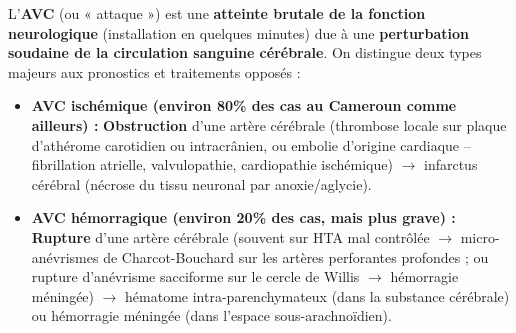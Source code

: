 \documentclass[11pt]{article}
\begin{document}
\begin{definition}
L'\textbf{AVC} (ou « attaque ») est une \textbf{atteinte brutale de la fonction neurologique} (installation en quelques minutes) due à une \textbf{perturbation soudaine de la circulation sanguine cérébrale}. On distingue deux types majeurs aux pronostics et traitements opposés :
\begin{itemize}
    \item \textbf{AVC ischémique (environ 80\% des cas au Cameroun comme ailleurs) :} \textbf{Obstruction} d'une artère cérébrale (thrombose locale sur plaque d'athérome carotidien ou intracrânien, ou embolie d'origine cardiaque -- fibrillation atrielle, valvulopathie, cardiopathie ischémique) $\rightarrow$ infarctus cérébral (nécrose du tissu neuronal par anoxie/aglycie).
    \item \textbf{AVC hémorragique (environ 20\% des cas, mais plus grave) :} \textbf{Rupture} d'une artère cérébrale (souvent sur HTA mal contrôlée $\rightarrow$ micro-anévrismes de Charcot-Bouchard sur les artères perforantes profondes ; ou rupture d'anévrisme sacciforme sur le cercle de Willis $\rightarrow$ hémorragie méningée) $\rightarrow$ hématome intra-parenchymateux (dans la substance cérébrale) ou hémorragie méningée (dans l'espace sous-arachnoïdien).
\end{itemize}
\end{definition}
\end{document}
